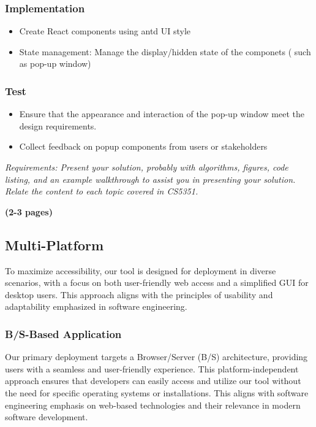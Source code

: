 \documentclass[journal]{IEEEtran}
\begin{document}
\subsubsection{Implementation}
\begin{itemize}
  \item Create React components using antd UI style
  \item State management: Manage the display/hidden state of the componets ( such as pop-up window)
\end{itemize}

\subsubsection{Test}
\begin{itemize}
  \item Ensure that the appearance and interaction of the pop-up window meet the design requirements.
  \item Collect feedback on popup components from users or stakeholders
\end{itemize}


\vspace{1em}
\textit{Requirements: Present your solution, probably with algorithms, figures, code listing, and an example walkthrough to assist you in presenting your solution. Relate the content to each topic covered in CS5351.}

\textbf{(2-3 pages)}


\subsection{Multi-Platform}

To maximize accessibility, our tool is designed for deployment in diverse scenarios, with a focus on both user-friendly web access and a simplified GUI for desktop users. This approach aligns with the principles of usability and adaptability emphasized in software engineering.

\subsubsection{B/S-Based Application}

Our primary deployment targets a Browser/Server (B/S) architecture, providing users with a seamless and user-friendly experience. This platform-independent approach ensures that developers can easily access and utilize our tool without the need for specific operating systems or installations. This aligns with software engineering emphasis on web-based technologies and their relevance in modern software development.
\end{document}
